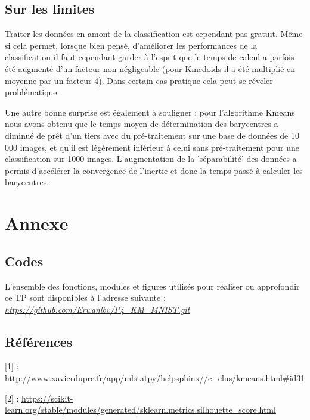\documentclass{article}
\begin{document}
\subsection{Sur les limites}

Traiter les données en amont de la classification est cependant pas gratuit. Même si cela permet, lorsque bien pensé, d'améliorer les performances de la classification il faut cependant garder à l'esprit que le temps de calcul a parfois été augmenté d'un facteur non négligeable (pour Kmedoids il a été multiplié en moyenne par un facteur 4). Dans certain cas pratique cela peut se réveler problématique. 

Une autre bonne surprise est également à souligner : pour l'algorithme Kmeans nous avons obtenu que le temps moyen de détermination des barycentres a diminué de prêt d'un tiers avec du pré-traitement sur une base de données de 10 000 images, et qu'il est légèrement inférieur à celui sans pré-traitement pour une classification sur 1000 images. L'augmentation de la 'séparabilité' des données a permis d'accélérer la convergence de l'inertie et donc la temps passé à calculer les barycentres.

\section{Annexe}

\subsection{Codes}
L'ensemble des fonctions, modules et figures utilisés pour réaliser ou approfondir ce TP sont disponibles à l'adresse suivante : \href{https://github.com/Erwanlbv/P4_KM_MNIST.git}{\underline{\textit{https://github.com/Erwanlbv/P4\_KM\_MNIST.git}}}

\subsection{Références}

[1] : \url{http://www.xavierdupre.fr/app/mlstatpy/helpsphinx//c_clus/kmeans.html#id31}

[2] : \url{https://scikit-learn.org/stable/modules/generated/sklearn.metrics.silhouette_score.html}
\end{document}
